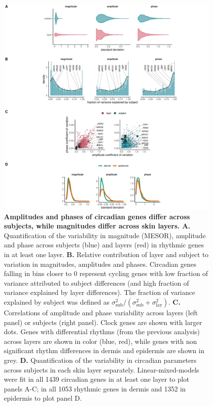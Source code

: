 \begin{figure}[]
	\begin{center}
		\includegraphics[width=\textwidth]{./Figures/fig2.pdf}
				\caption{\textbf{Amplitudes and phases of circadian genes differ across subjects, while magnitudes differ across skin layers. A.} Quantification of the variability in magnitude (MESOR), amplitude and phase across subjects (blue) and layers (red) in rhythmic genes in at least one layer. \textbf{B.} Relative contribution of layer and subject to variation in magnitudes, amplitudes and phases. Circadian genes falling in bins closer to 0 represent cycling genes with low fraction of variance attributed to subject differences (and high fraction of variance explained by layer differences). The fraction of variance explained by subject was defined as $\sigma^2_\textrm{sub}/(\sigma^2_\textrm{sub} + \sigma^2_\textrm{lay})$. \textbf{C.} Correlations of amplitude and phase variability across layers (left panel) or subjects (right panel). Clock genes are shown with larger dots. Genes with differential rhythms (from the previous analysis) across layers are shown in color (blue, red), while genes with non significant rhythm differences in dermis and epidermis are shown in grey. \textbf{D. } Quantification of the variability in circadian parameters across subjects in each skin layer separately. Linear-mixed-models were fit in all 1439 circadian genes in at least one layer to plot panels A-C; in all 1053 rhythmic genes in dermis and 1352 in epidermis to plot panel D. }
	

\end{center}
\end{figure}
